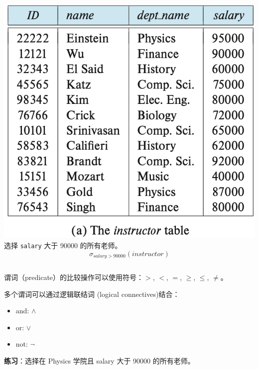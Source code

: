 \documentclass[aspectratio=169, 14pt]{beamer}
\begin{document}
\begin{frame}

    \begin{columns}
        \includegraphics[width=\textwidth]{table/instructor}
        \alert{选择} \texttt{salary} 大于 90000 的所有老师。
        \large{\[\sigma_{salary >  90000}(instructor)\]}
    \end{columns} 

\end{frame}

\begin{frame}
谓词（predicate）的比较操作可以使用符号：$>$, $<$, $=$, $\geq$, $\leq$, $\neq$。

多个谓词可以通过\alert{逻辑联结词} (logical connectives)结合：

\begin{itemize}
    \item and: $\land$
    \item or: $\lor$
    \item not: $\neg$
\end{itemize}
    
\pause

{\large {}} \textbf{练习}：选择在 Physics 学院且 salary 大于 90000 的所有老师。

\end{frame}
\end{document}
